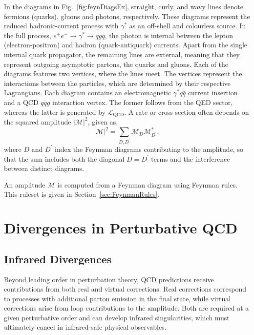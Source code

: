 In the diagrams in Fig.~\ref{fig:feynDiagsEx}, straight, curly, and wavy
lines denote fermions (quarks), gluons and photons, respectively. 
These diagrams represent the reduced hadronic-current process with $\gamma^*$ as an 
off-shell and colourless source. In the full 
process, $e^+e^-\to\gamma^*\to qg\bar q$, the photon is internal between the 
lepton (electron-positron) and hadron (quark-antiquark) currents. 
Apart from the single internal quark propagator, the remaining lines are external, meaning that they represent outgoing asymptotic partons, the quarks and gluons. Each of the diagrams features 
two vertices, where the lines meet. The vertices represent the interactions between 
the particles, which are determined by their respective Lagrangians. 
Each diagram contains an electromagnetic $\gamma^*q\bar q$ current insertion and a 
QCD $q\bar qg$ interaction vertex. The former follows from the QED sector, whereas 
the latter is generated by $\mathcal L_\mathrm{QCD}$.
A rate or cross section often depends on the squared amplitude $|\mathcal M|^2$, given as,
\begin{equation}
    |\mathcal M|^2 = \sum_{D,D^\prime} \mathcal M_D\mathcal M_{D^\prime}^*,
\end{equation}
where $D$ and $D^\prime$ index the Feynman diagrams contributing to the amplitude, so
that the sum includes both the diagonal $D=D^\prime$ terms and the interference between
distinct diagrams.

An amplitude $\mathcal M$ is computed from a Feynman diagram using Feynman rules. 
This ruleset is given in Section~\ref{sec:FeynmanRules}.

\section{Divergences in Perturbative QCD}\label{sec:divergences}

\subsection{Infrared Divergences}\label{subsec:infDivergences}

Beyond leading order in perturbation theory, QCD predictions receive contributions
from both real and virtual corrections. Real corrections correspond to processes with
additional parton emission in the final state, while virtual corrections arise from
loop contributions to the amplitude. Both are required at a given perturbative order
and can develop infrared singularities, which must ultimately cancel in infrared-safe
physical observables.


